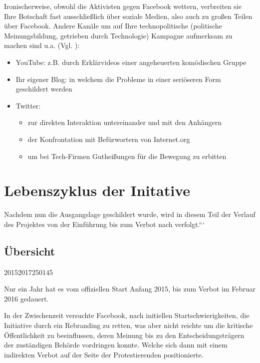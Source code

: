 \documentclass{article}
\begin{document}
\medskip

Ironischerweise, obwohl die Aktivisten gegen Facebook wettern, verbreiten sie Ihre Botschaft fast ausschließlich über soziale Medien, also auch zu großen Teilen über Facebook. Andere Kanäle um auf Ihre technopolitische (politische Meinungsbildung, getrieben durch Technologie) Kampagne aufmerksam zu machen sind u.a. (Vgl. \cite{prasad2017}):
\begin{itemize}
  \item YouTube: z.B. durch Erklärvideos einer angeheuerten komödischen Gruppe
  \item Ihr eigener Blog: in welchem die Probleme in einer seriöseren Form geschildert werden
  \item Twitter:
    \begin{itemize}
      \item zur direkten Interaktion untereinander und mit den Anhängern
      \item der Konfrontation mit Befürwortern von Internet.org
      \item um bei Tech-Firmen Gutheißungen für die Bewegung zu erbitten
    \end{itemize}
\end{itemize}

\section{Lebenszyklus der Initative}

Nachdem nun die Ausgangslage geschildert wurde, wird in diesem Teil der Verlauf des Projektes von der Einführung bis zum Verbot nach verfolgt.```

\subsection{Übersicht}

\begin{timeline}{2015}{2017}{250}{145}
\end{timeline}

Nur ein Jahr hat es vom offiziellen Start Anfang 2015, bis zum Verbot im Februar 2016 gedauert.

In der Zwischenzeit versuchte Facebook, nach initiellen Startschwierigkeiten, die Initiative durch ein Rebranding zu retten, was aber nicht reichte um die kritische Öffentlichkeit zu beeinflussen, deren Meinung bis zu den Entscheidungsträgern der zuständigen Behörde vordringen konnte.
Welche sich dann mit einem indirekten Verbot auf der Seite der Protestierenden positionierte.
\end{document}
